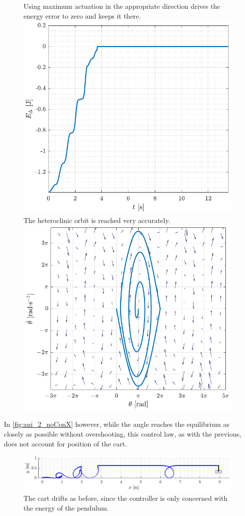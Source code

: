 \begin{figure}[H]
  \hspace{-10pt}
  \captionbox
  {
    Using maximum actuation in the appropriate direction drives the energy error to zero and keeps it there.
    \label{fig:Edelta_2_noConX}
  }
  {
    \hspace{-1cm}
    \includegraphics[width=.453\textwidth]{figures/Edelta_2_noConX}
  }
  \hspace{20pt}
  \captionbox 
  {
    The heteroclinic orbit is reached very accurately.
    \label{fig:phase_2_noConX}
  }
  {
    \hspace{-1cm}
    \includegraphics[width=.46\textwidth]{figures/phase_2_noConX}
  }  
\end{figure}
%
In \autoref{fig:ani_2_noConX} however, while the angle reaches the equilibrium as closely as possible without overshooting, this control law, as with the previous, does not account for position of the cart.
%
\begin{figure}[H]
  \includegraphics[width=1\textwidth]{figures/ani_2_noConX}
  \caption{The cart drifts as before, since the controller is only concerned with the energy of the pendulum.}
  \label{fig:ani_2_noConX}
\end{figure}
